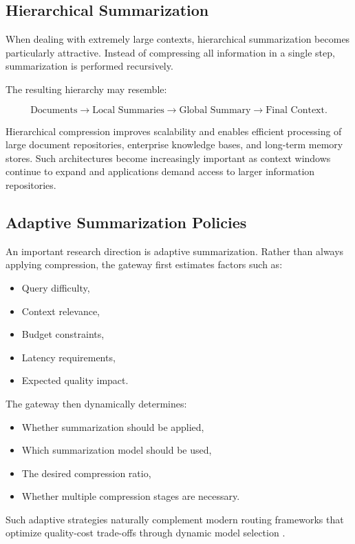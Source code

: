 \documentclass[11pt,a4paper]{article}
\begin{document}
\subsection{Hierarchical Summarization}

When dealing with extremely large contexts, hierarchical summarization becomes particularly attractive. Instead of compressing all information in a single step, summarization is performed recursively.

The resulting hierarchy may resemble:

\[
\text{Documents}
\rightarrow
\text{Local Summaries}
\rightarrow
\text{Global Summary}
\rightarrow
\text{Final Context}.
\]

Hierarchical compression improves scalability and enables efficient processing of large document repositories, enterprise knowledge bases, and long-term memory stores. Such architectures become increasingly important as context windows continue to expand and applications demand access to larger information repositories.

\subsection{Adaptive Summarization Policies}

An important research direction is adaptive summarization. Rather than always applying compression, the gateway first estimates factors such as:

\begin{itemize}
\item Query difficulty,
\item Context relevance,
\item Budget constraints,
\item Latency requirements,
\item Expected quality impact.
\end{itemize}

The gateway then dynamically determines:

\begin{itemize}
\item Whether summarization should be applied,
\item Which summarization model should be used,
\item The desired compression ratio,
\item Whether multiple compression stages are necessary.
\end{itemize}

Such adaptive strategies naturally complement modern routing frameworks that optimize quality-cost trade-offs through dynamic model selection \cite{frugalgpt,routellm,manias2024semanticroutingenhancedperformance}.
\end{document}

